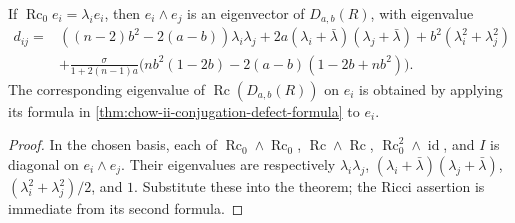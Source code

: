 \begin{corollary}
  \label{cor:chow-ii-conjugation-defect-eigenvalues}
  If \(\operatorname{Rc}_0e_i=\lambda_i e_i\), then \(e_i\wedge e_j\) is an
  eigenvector of \(D_{a,b}(R)\), with eigenvalue
  \[
  \begin{aligned}
  d_{ij}={}&((n-2)b^2-2(a-b))\lambda_i\lambda_j
   +2a(\lambda_i+\bar\lambda)(\lambda_j+\bar\lambda)
   +b^2(\lambda_i^2+\lambda_j^2)\\
   &+\frac{\sigma}{1+2(n-1)a}
   \bigl(nb^2(1-2b)-2(a-b)(1-2b+nb^2)\bigr).
  \end{aligned}
  \]
  The corresponding eigenvalue of \(\operatorname{Rc}(D_{a,b}(R))\) on
  \(e_i\) is obtained by applying its formula in
  \ref{thm:chow-ii-conjugation-defect-formula} to \(e_i\).
\end{corollary}
\begin{proof}
\sketch
  In the chosen basis, each of
  \(\operatorname{Rc}_0\wedge\operatorname{Rc}_0\),
  \(\operatorname{Rc}\wedge\operatorname{Rc}\),
  \(\operatorname{Rc}_0^2\wedge\operatorname{id}\), and \(I\) is diagonal on
  \(e_i\wedge e_j\).  Their eigenvalues are respectively
  \(\lambda_i\lambda_j\),
  \((\lambda_i+\bar\lambda)(\lambda_j+\bar\lambda)\),
  \((\lambda_i^2+\lambda_j^2)/2\), and \(1\).  Substitute these into the
  theorem; the Ricci assertion is immediate from its second formula.
\end{proof}
